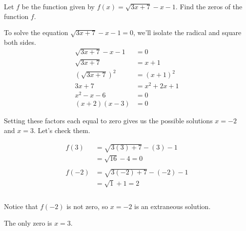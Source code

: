 \documentclass[nooutcomes]{ximera}
\begin{document}
	\begin{example}

		Let $f$ be the function given by $f(x) =  \sqrt{3x+7} - x-1$. Find the zeros of the function $f$.
	
		\begin{explanation} 
			
			To solve the equation $\sqrt{3x+7} - x-1 =  0$, we'll isolate the radical and square both sides.
			\begin{align*}
				\sqrt{3x+7} - x-1 & =  0 \\
				\sqrt{3x+7} & =  x + 1 \\
				\left( \sqrt{3x+7} \right)^2 & =  (x + 1)^2 \\
				3x + 7 &= x^2 + 2x + 1\\
				x^2 - x - 6 &= 0\\
				(x+2)(x-3) &= 0
			\end{align*}			

			Setting these factors each equal to zero gives us the possible solutions $x=-2$ and $x=3$. Let's check them.
			
			\begin{align*}
				f(3) &= \sqrt{3(3)+7} - (3)-1	\\
					&= \sqrt{16} - 4 = 0 \\ \\
				f(-2) &= \sqrt{3(-2)+7} - (-2)-1	\\
					&= \sqrt{1} + 1 = 2 \\ \\
			\end{align*}
			
			Notice that $f(-2)$ is not zero, so $x=-2$ is an extraneous solution.			
			
			The only zero is $x=3$.
		\end{explanation}
	\end{example}
	
\end{document}
